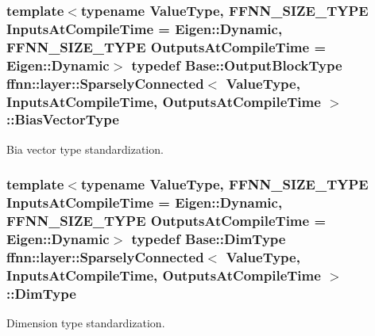 \hypertarget{classffnn_1_1layer_1_1_sparsely_connected_ad2d566cbb6c54c8723d79737075b4a00}{
\subsubsection[{Bias\-Vector\-Type}]{\setlength{\rightskip}{0pt plus 5cm}template$<$typename Value\-Type, F\-F\-N\-N\-\_\-\-S\-I\-Z\-E\-\_\-\-T\-Y\-P\-E Inputs\-At\-Compile\-Time = Eigen\-::\-Dynamic, F\-F\-N\-N\-\_\-\-S\-I\-Z\-E\-\_\-\-T\-Y\-P\-E Outputs\-At\-Compile\-Time = Eigen\-::\-Dynamic$>$ typedef {\bf Base\-::\-Output\-Block\-Type} {\bf ffnn\-::layer\-::\-Sparsely\-Connected}$<$ Value\-Type, Inputs\-At\-Compile\-Time, Outputs\-At\-Compile\-Time $>$\-::{\bf Bias\-Vector\-Type}}}\label{classffnn_1_1layer_1_1_sparsely_connected_ad2d566cbb6c54c8723d79737075b4a00}


Bia vector type standardization. 

\hypertarget{classffnn_1_1layer_1_1_sparsely_connected_aac5a60b2b5f1310acbb39822feb58210}{
\subsubsection[{Dim\-Type}]{\setlength{\rightskip}{0pt plus 5cm}template$<$typename Value\-Type, F\-F\-N\-N\-\_\-\-S\-I\-Z\-E\-\_\-\-T\-Y\-P\-E Inputs\-At\-Compile\-Time = Eigen\-::\-Dynamic, F\-F\-N\-N\-\_\-\-S\-I\-Z\-E\-\_\-\-T\-Y\-P\-E Outputs\-At\-Compile\-Time = Eigen\-::\-Dynamic$>$ typedef {\bf Base\-::\-Dim\-Type} {\bf ffnn\-::layer\-::\-Sparsely\-Connected}$<$ Value\-Type, Inputs\-At\-Compile\-Time, Outputs\-At\-Compile\-Time $>$\-::{\bf Dim\-Type}}}\label{classffnn_1_1layer_1_1_sparsely_connected_aac5a60b2b5f1310acbb39822feb58210}


Dimension type standardization. 

